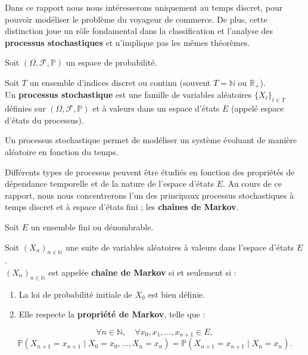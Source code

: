 \documentclass{article}
\begin{document}
Dans ce rapport nous nous intéresserons uniquement au temps discret, pour pouvoir modéliser le problème du voyageur de commerce.
De plus, cette distinction joue un rôle fondamental dans la classification et l'analyse des \textbf{processus stochastiques} et n'implique pas les mêmes théorèmes. \\

\begin{tcolorbox}[colback=white,colframe=blue!80!black,title=Processus Stochastique]
Soit $(\Omega, \mathcal{F}, \mathbb{P})$ un espace de probabilité.

Soit $T$ un ensemble d'indices discret ou continu (souvent $T = \mathbb{N}$ ou $\mathbb{R}_+$). \\

Un \textbf{processus stochastique} est une famille de variables aléatoires $\{X_t\}_{t \in T}$ définies sur $(\Omega, \mathcal{F}, \mathbb{P})$ et à valeurs dans un espace d'états $E$ (appelé espace d'états du processus).
\end{tcolorbox}

Un processus stochastique permet de modéliser un système évoluant de manière aléatoire en fonction du temps.

Différents types de processus peuvent être étudiés en fonction des propriétés de dépendance temporelle et de la nature de l'espace d'états $E$.
Au cours de ce rapport, nous nous concentrerons l'un des principaux processus stochastiques à temps discret et à espace d'états fini ; les \textbf{chaînes de Markov}. \\

\begin{tcolorbox}[colback=white,colframe=red!80!black,title=Chaîne de Markov]
Soit $E$ un ensemble fini ou dénombrable.

Soit $(X_n)_{n \in \mathbb{N}}$ une suite de variables aléatoires à valeurs dans l'espace d'états $E$. \\

$(X_n)_{n \in \mathbb{N}}$ est appelée \textbf{chaîne de Markov} si et seulement si :
\begin{enumerate}[leftmargin=5em, label=(\arabic*)]
    \item La loi de probabilité initiale de $X_0$ est bien définie.
    \item Elle respecte la \textbf{propriété de Markov}, telle que :
\end{enumerate}
\[
\forall n \in \mathbb{N}, \quad \forall x_0, x_1, \dots, x_{n+1} \in E,
\]
\[
\mathbb{P}(X_{n+1} = x_{n+1} \mid X_0 = x_0, \dots, X_n = x_n) = \mathbb{P}(X_{n+1} = x_{n+1} \mid X_n = x_n).
\]
\end{tcolorbox}
\end{document}
